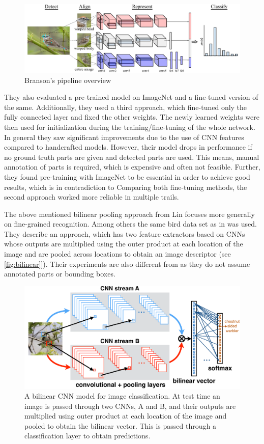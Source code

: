 \documentclass[electronic]{vgtc}             %
\begin{document}
	\begin{figure}[h]
		\includegraphics[width=.48\textwidth]{branson-pipeline}
		\caption{Branson's pipeline overview \cite{Branson:2014}}
		\label{fig:branson}
	\end{figure}
	
	They also evaluated a pre-trained model on ImageNet and a fine-tuned version of the same.
	Additionally, they used a third approach, which fine-tuned only the fully connected layer and fixed the other weights.
	The newly learned weights were then used for initialization during the training/fine-tuning of the whole network. 
	In general they saw significant improvements due to the use of CNN features compared to handcrafted models. 
	However, their model drops in performance if no ground truth parts are given and detected parts are used.
	This means, manual annotation of parts is required, which is expensive and often not feasible.
	Further, they found pre-training with ImageNet to be essential in order to achieve good results, which is in contradiction to \cite{Freytag:2014,Norouzzadeh:2017,Norouzzadeh:2017:Count}
	Comparing both fine-tuning methods, the second approach worked more reliable in multiple trails.
	
	The above mentioned bilinear pooling approach from Lin \cite{Lin:2015} focuses more generally on fine-grained recognition. 
	Among others the same bird data set as in \cite{Branson:2014} was used.
	They describe an approach, which has two feature extractors based on CNNs whose outputs are multiplied using the outer product at each location of the image and are pooled across locations to obtain an image descriptor (see \autoref{fig:bilinear}]).
	Their experiments are also different from \cite{Branson:2014} as they do not assume annotated parts or bounding boxes.
	
	\begin{figure}[h]
		\includegraphics[width=.48\textwidth]{bilinear}
		\caption{A bilinear CNN model for image classification. At	test time an image is passed through two CNNs, A and B, and their outputs are multiplied using outer product at each location of the image and pooled to obtain the bilinear vector. This is passed through a classification layer to obtain predictions.\cite{Lin:2015}}
		\label{fig:bilinear}
	\end{figure}
	
\end{document}
